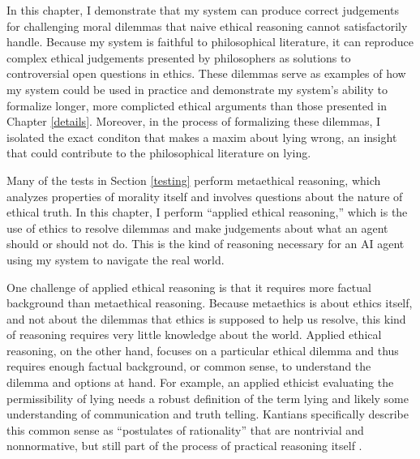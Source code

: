 %
\begin{isabellebody}%
%
%
\isadelimtheory
%
\endisadelimtheory
%
\isatagtheory
%
\endisatagtheory
{\isafoldtheory}%
%
\isadelimtheory
%
\endisadelimtheory
%
\isadelimdocument
%
\endisadelimdocument
%
\isatagdocument
%
\isamarkuptrue%
%
\endisatagdocument
{\isafolddocument}%
%
\isadelimdocument
%
\endisadelimdocument
%
\begin{isamarkuptext}%
In this chapter, I demonstrate that my system can produce correct judgements for challenging moral 
dilemmas that naive ethical reasoning cannot satisfactorily handle. Because my system is faithful to
philosophical literature, it can reproduce complex ethical judgements presented by philosophers as 
solutions to controversial open questions in ethics.
These dilemmas serve as examples of how my system could be used
in practice and demonstrate my system's ability to formalize longer, more complicted ethical arguments
than those presented in Chapter \ref{details}. Moreover, in the process of formalizing these dilemmas, 
I isolated the exact conditon that makes a maxim about lying wrong, an insight that could contribute to 
the philosophical literature on lying.

Many of the tests in Section \ref{testing} perform metaethical reasoning, which analyzes properties
of morality itself and involves questions about the nature of ethical truth. In this chapter, I perform
``applied ethical reasoning,'' which is the use of ethics to resolve dilemmas and make judgements about 
what an agent should or should not do. This is the kind of reasoning necessary for an AI agent using my system to
navigate the real world.

One challenge of applied ethical reasoning is that it requires more factual background than metaethical
reasoning. Because metaethics is about ethics itself, and not about the dilemmas that ethics is 
supposed to help us resolve, this kind of reasoning requires very little knowledge about the world. 
Applied ethical reasoning, on the other hand,
focuses on a particular ethical dilemma and thus requires enough factual background, or common sense, 
to understand the dilemma and options at hand. For example, an applied ethicist 
evaluating the permissibility of lying needs a robust definition of the term lying and likely some
understanding of communication and truth telling. Kantians specifically describe
this common sense as ``postulates of rationality'' that are nontrivial and nonnormative, but still
part of the process of practical reasoning itself \citep{silber}. 


\end{isamarkuptext}
\end{isabellebody}
